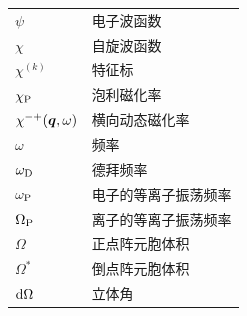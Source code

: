 \par\bigbreak
{\small
\begin{tabular}{@{}p{}@{}p{}@{}}
$\psi$ & 电子波函数 \\
$\chi$ & 自旋波函数 \\
$\chi^{(k)}$ & 特征标 \\
$\chi_{\rm P}$ & 泡利磁化率 \\
$\chi^{-+}(\bm{q},\omega)$ & 横向动态磁化率 \\
$\omega$ & 频率 \\
$\omega_{\rm D}$ & 德拜频率 \\
$\omega_{\rm P}$ & 电子的等离子振荡频率 \\
$\Omega_{\rm P}$ & 离子的等离子振荡频率 \\
$\Omega$ & 正点阵元胞体积 \\
$\Omega^{*}$ & 倒点阵元胞体积 \\
${\rm d}\Omega$ & 立体角 \\
\end{tabular}
}

